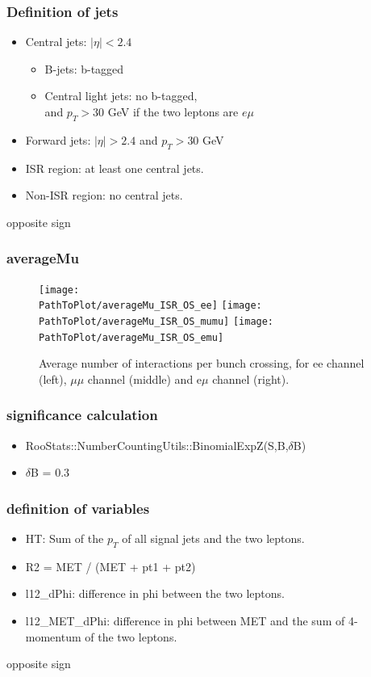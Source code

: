 \documentclass[mathserif,serif]{beamer}
\begin{document}
\begin{frame}
\frametitle{Definition of jets}
\normalsize
\begin{itemize}
\item Central jets: $|\eta|<2.4$
\begin{itemize}
\item B-jets: b-tagged
\item Central light jets: no b-tagged,\\
and $p_T>30$ GeV if the two leptons are $e\mu$
\end{itemize}
\item Forward jets: $|\eta|>2.4$ and $p_T>30$ GeV
\item ISR region: at least one central jets.
\item Non-ISR region: no central jets.
\end{itemize}
\end{frame}

\begin{frame}
\begin{center}
\huge
opposite sign
\end{center}
\end{frame}




\def \PathToPlot {../plot}
\begin{frame}
\frametitle{averageMu}
\begin{figure}
\texttt{[image: \\PathToPlot/averageMu\_ISR\_OS\_ee]}
\texttt{[image: \\PathToPlot/averageMu\_ISR\_OS\_mumu]}
\texttt{[image: \\PathToPlot/averageMu\_ISR\_OS\_emu]} \\
\caption{Average number of interactions per bunch crossing, for ee channel (left), $\mu\mu$ channel (middle) and e$\mu$ channel (right).}
\end{figure}
\end{frame}

\begin{frame}
\frametitle{significance calculation}
\begin{itemize}
\item RooStats::NumberCountingUtils::BinomialExpZ(S,B,$\delta$B)
\item $\delta$B = 0.3
\end{itemize}
\end{frame}

\begin{frame}
\frametitle{definition of variables}
\normalsize
\begin{itemize}
\item HT: Sum of the $p_T$ of all signal jets and the two leptons.
\item R2 = MET / (MET + pt1 + pt2)
\item l12\_dPhi: difference in phi between the two leptons.
\item l12\_MET\_dPhi: difference in phi between MET and the sum of 4-momentum of the two leptons.
\end{itemize}
\end{frame}

\begin{frame}
\begin{center}
\huge
opposite sign
\end{center}
\end{frame}

\def \PathToPlot {../plot}

\end{document}
